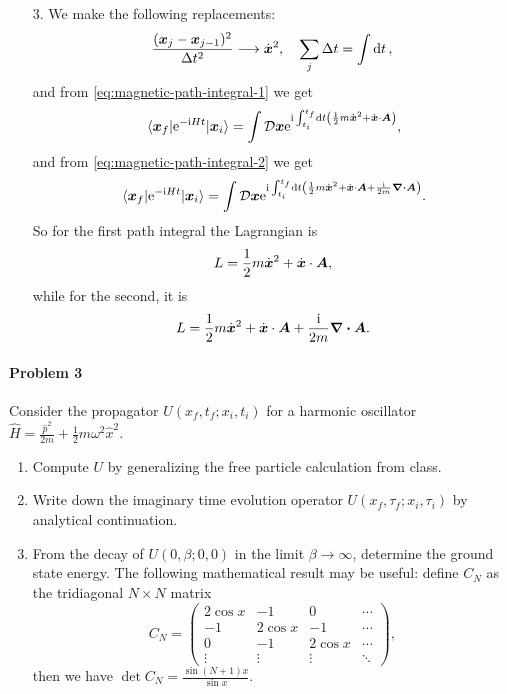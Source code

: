 \documentclass[hyperref, a4paper]{article}
\newcommand*{\ii}{\mathrm{i}}
\newcommand*{\ee}{\mathrm{e}}
\newcommand*{\fd}[1]{\mathcal{D} #1}
\begin{document}
\begin{itemize}
\item[3.] We make the following replacements:
\[
    \frac{(\vb*{x}_j - \vb*{x}_{j-1})^2}{\Delta t^2} \longrightarrow \dot{\vb*{x}}^2, \quad 
    \sum_j \Delta t = \int \dd{t},
\]
and from \eqref{eq:magnetic-path-integral-1} we get 
\begin{equation}
    \mel{\vb*{x}_f}{\ee^{- \ii H t}}{\vb*{x}_i} = \int \fd{\vb*{x}} \ee^{\ii \int_{t_i}^{t_f} \dd{t}
    \left(  \frac{1}{2} m \dot{\vb*{x}}^2 + \dot{\vb*{x}} \cdot \vb*{A}\right) },
\end{equation} 
and from \eqref{eq:magnetic-path-integral-2} we get 
\begin{equation}
    \mel{\vb*{x}_f}{\ee^{- \ii H t}}{\vb*{x}_i} = \int \fd{\vb*{x}} \ee^{\ii \int_{t_i}^{t_f} \dd{t}
    \left(  \frac{1}{2} m \dot{\vb*{x}}^2 + \dot{\vb*{x}} \cdot \vb*{A} + \frac{\ii}{2m} \div{\vb*{A}} \right) }.
\end{equation}
So for the first path integral the Lagrangian is 
\begin{equation}
    L = \frac{1}{2} m \dot{\vb*{x}}^2 + \dot{\vb*{x}} \cdot \vb*{A},
\end{equation}
while for the second, it is 
\begin{equation}
    L = \frac{1}{2} m \dot{\vb*{x}}^2 + \dot{\vb*{x}} \cdot \vb*{A} + \frac{\ii}{2m} \div{\vb*{A}}.
\end{equation}


\end{itemize}

\paragraph{Problem 3} Consider the propagator $U\left(x_f, t_f ; x_i, t_i\right)$ for a harmonic oscillator $\hat{H}=\frac{\hat{p}^2}{2 m}+\frac{1}{2} m \omega^2 \hat{x}^2$.
\begin{enumerate}
    \item Compute $U$ by generalizing the free particle calculation from class.
    \item Write down the imaginary time evolution operator $U\left(x_f, \tau_f ; x_i, \tau_i\right)$ by analytical continuation.
    \item From the decay of $U(0, \beta ; 0,0)$ in the limit $\beta \rightarrow \infty$, determine the ground state energy.
    The following mathematical result may be useful: define $C_N$ as the tridiagonal $N \times N$ matrix
    $$
    C_N=\left(\begin{array}{cccc}
    2 \cos x & -1 & 0 & \cdots \\
    -1 & 2 \cos x & -1 & \cdots \\
    0 & -1 & 2 \cos x & \cdots \\
    \vdots & \vdots & \vdots & \ddots
    \end{array}\right),
    $$
    then we have $\operatorname{det} C_N=\frac{\sin (N+1) x}{\sin x}$.
\end{enumerate}
\end{document}
